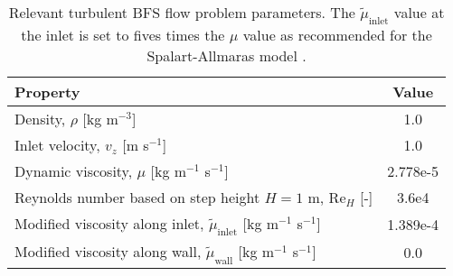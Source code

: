 \begin{table}[htb]
  \centering
  \small
  \caption{Relevant turbulent \gls{BFS} flow problem parameters. The $\tilde{\mu}_\text{inlet}$ value
  at the inlet is set to fives times the $\mu$ value as recommended for the Spalart-Allmaras model
  \cite{spalart_one-equation_1994}.}
  \begin{tabular}{l S}
    \toprule
    Property & {Value} \\
    \midrule
    Density, $\rho$ [kg m$^{-3}$] & 1.0 \\
    Inlet velocity, $v_z$ [m s$^{-1}$] & 1.0 \\
    Dynamic viscosity, $\mu$ [kg m$^{-1}$ s$^{-1}$] & 2.778e-5 \\
    Reynolds number based on step height $H=1$ m, Re$_H$ [-] & 3.6e4 \\
    Modified viscosity along inlet, $\tilde{\mu}_\text{inlet}$ [kg m$^{-1}$ s$^{-1}$] & 1.389e-4 \\
    Modified viscosity along wall, $\tilde{\mu}_\text{wall}$ [kg m$^{-1}$ s$^{-1}$] & 0.0 \\
    \bottomrule
  \end{tabular}
  \label{table:bfs}
\end{table}

